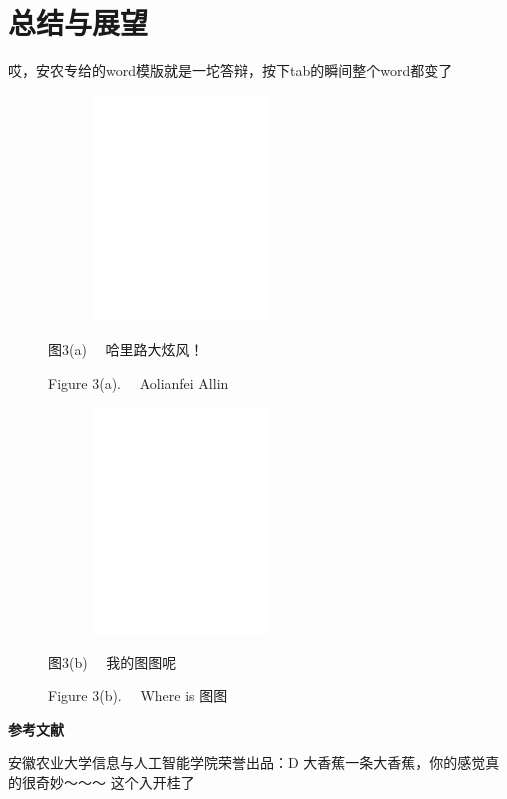 \documentclass[UTF8,a4paper,12pt]{ctexart}
\begin{document}
	\section{总结与展望}
	哎，安农专给的word模版就是一坨答辩，按下tab的瞬间整个word都变了
	
	\begin{figure}[h]
		\vspace{-0.1cm} 
		\begin{minipage}[t]{0.45\linewidth}
			\centering
			\includegraphics[height=6cm,width=7cm]{pic/fknumscom-eps-converted-to.pdf}
			
			\begin{center}
				\fontsize{11pt}{\baselineskip}\heiti 图3(a) \ \  哈里路大炫风！ \par Figure 3(a). \ \ Aolianfei Allin
			\end{center} 
		\end{minipage}
		\begin{minipage}[t]{0.45\linewidth}
			\centering
			\includegraphics[height=6cm,width=7cm]{pic/fknumstime-eps-converted-to.pdf}
			
			\begin{center}
				\fontsize{11pt}{\baselineskip}\heiti 图3(b)  \ \  我的图图呢  \par Figure 3(b). \ \ Where is 图图
			\end{center} 
		\end{minipage}
	\end{figure}
	\newpage
	 
	\centerline{\textbf{\fontsize{16pt}{\baselineskip}\heiti 参考文献}}
	\small
	\vspace{-0.5cm} 
	\renewcommand{\refname}{\leftline{Reference}}
	\begin{thebibliography}{}
		\vspace{-1cm} 
		安徽农业大学信息与人工智能学院荣誉出品：D
		大香蕉一条大香蕉，你的感觉真的很奇妙～～～
		这个入开桂了
	\end{thebibliography}
\end{document}
